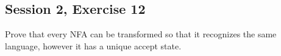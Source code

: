 \subsection{Session 2, Exercise 12}


Prove that every NFA can be transformed so that it recognizes the same language, however it has a unique accept state.

